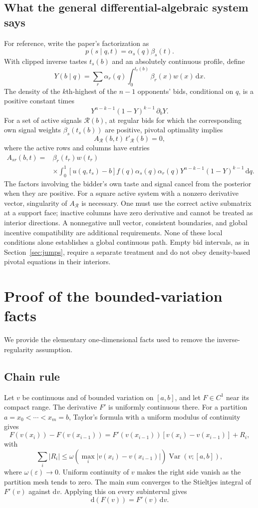 \documentclass[11pt,a4paper]{article}
\numberwithin{equation}{section}
\theoremstyle{definition}
\theoremstyle{remark}
\newcommand{\dd}{\,\mathrm d}
\DeclareMathOperator{\Var}{Var}
\begin{document}
\subsection{What the general differential-algebraic system says}
For reference, write the paper's factorization as
\[
 p(s\mid q,t)=\alpha_s(q)\beta_s(t).
\]
With clipped inverse tastes $t_s(b)$ and an absolutely continuous profile, define
\[
 Y(b\mid q)=\sum_r\alpha_r(q)\int_0^{t_r(b)}\beta_r(x)w(x)\dd x.
\]
The density of the $k$th-highest of the $n-1$ opponents' bids, conditional on $q$, is a positive constant times
\[
 Y^{n-k-1}(1-Y)^{k-1}\,\partial_bY.
\]
For a set of active signals $\mathcal R(b)$, at regular bids for which the corresponding own signal weights $\beta_s(t_s(b))$ are positive, pivotal optimality implies
\[
 A_{\mathcal R}(b,t)\,t'_{\mathcal R}(b)=0,
\]
where the active rows and columns have entries
\begin{align*}
 A_{sr}(b,t)={}&\beta_r(t_r)w(t_r)\\[-2pt]
 &\times\int_0^1[u(q,t_s)-b]f(q)\alpha_s(q)\alpha_r(q)
 Y^{n-k-1}(1-Y)^{k-1}\dd q.
\end{align*}
The factors involving the bidder's own taste and signal cancel from the posterior when they are positive. For a square active system with a nonzero derivative vector, singularity of $A_{\mathcal R}$ is necessary. One must use the correct active submatrix at a support face; inactive columns have zero derivative and cannot be treated as interior directions. A nonnegative null vector, consistent boundaries, and global incentive compatibility are additional requirements. None of these local conditions alone establishes a global continuous path. Empty bid intervals, as in Section~\ref{sec:jumps}, require a separate treatment and do not obey density-based pivotal equations in their interiors.

\appendix
\section{Proof of the bounded-variation facts}
\label{app:bv}

We provide the elementary one-dimensional facts used to remove the inverse-regularity assumption.

\subsection{Chain rule}
Let $v$ be continuous and of bounded variation on $[a,b]$, and let $F\in C^1$ near its compact range. The derivative $F'$ is uniformly continuous there. For a partition $a=x_0<\cdots<x_m=b$, Taylor's formula with a uniform modulus of continuity gives
\[
 F(v(x_i))-F(v(x_{i-1}))
 =F'(v(x_{i-1}))[v(x_i)-v(x_{i-1})]+R_i,
\]
with
\[
 \sum_i|R_i|
 \le\omega\!\left(\max_i|v(x_i)-v(x_{i-1})|\right)
 \Var(v;[a,b]),
\]
where $\omega(\varepsilon)\to0$. Uniform continuity of $v$ makes the right side vanish as the partition mesh tends to zero. The main sum converges to the Stieltjes integral of $F'(v)$ against $\mathrm dv$. Applying this on every subinterval gives
\[
 \mathrm d(F(v))=F'(v)\,\mathrm dv.
\]
\end{document}
